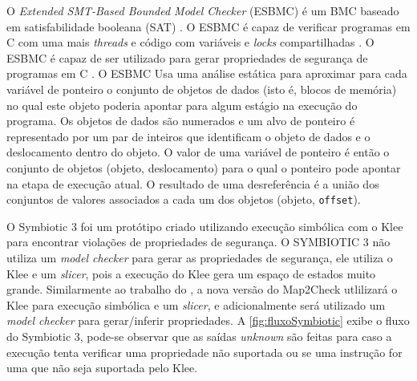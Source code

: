 \par
O \textit{Extended SMT-Based Bounded Model Checker} (ESBMC) é um BMC baseado em satisfabilidade booleana (SAT) \cite{Cordeiro:2012}. O ESBMC é capaz de verificar programas em C com uma mais \textit{threads} e código com variáveis e \textit{locks} compartilhadas \cite{Morse:2013}. O ESBMC é capaz de ser utilizado para gerar propriedades de segurança de programas em C \cite{Rocha:2015}. 
%
O ESBMC Usa uma análise estática para aproximar para cada variável de ponteiro o conjunto de objetos de dados (isto é, blocos de memória) no qual este objeto poderia apontar para algum estágio na execução do programa. Os objetos de dados são numerados e um alvo de ponteiro é representado por um par de inteiros que identificam o objeto de dados e o deslocamento dentro do objeto. O valor de uma variável de ponteiro é então o conjunto de objetos (objeto, deslocamento) para o qual o ponteiro pode apontar na etapa de execução atual. O resultado de uma desreferência é a união dos conjuntos de valores associados a cada um dos objetos (objeto, \texttt{offset}). 


\par
O Symbiotic 3 \cite{Chalupa:2016} foi um protótipo criado utilizando execução simbólica com o Klee para encontrar violações de propriedades de segurança. O SYMBIOTIC 3 não utiliza um \textit{model checker} para gerar as propriedades de segurança, ele utiliza o Klee e um \textit{slicer}, pois a execução do Klee gera um espaço de estados muito grande.  Similarmente ao trabalho do , a nova versão do Map2Check utlilizará o Klee para execução simbólica e um \textit{slicer}, e adicionalmente será utilizado um \textit{model checker} para gerar/inferir propriedades. A \autoref{fig:fluxoSymbiotic} exibe o fluxo do Symbiotic 3, pode-se observar que as saídas \textit{unknown} são feitas para caso a execução tenta verificar uma propriedade não suportada ou se uma instrução for uma que não seja suportada pelo Klee.

